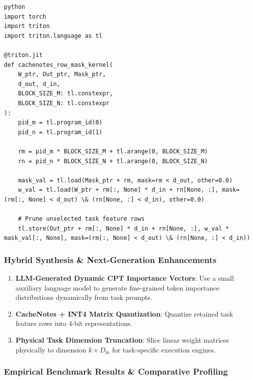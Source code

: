 \vspace{0.5em}
\begin{mdframed}[backgroundcolor=codebg, linecolor=codeframe, linewidth=1pt, roundcorner=4pt, innerleftmargin=2pt, innerrightmargin=5pt, innertopmargin=5pt, innerbottommargin=5pt]
\begin{lstlisting}
python
import torch
import triton
import triton.language as tl

@triton.jit
def cachenotes_row_mask_kernel(
    W_ptr, Out_ptr, Mask_ptr,
    d_out, d_in,
    BLOCK_SIZE_M: tl.constexpr,
    BLOCK_SIZE_N: tl.constexpr
):
    pid_m = tl.program_id(0)
    pid_n = tl.program_id(1)

    rm = pid_m * BLOCK_SIZE_M + tl.arange(0, BLOCK_SIZE_M)
    rn = pid_n * BLOCK_SIZE_N + tl.arange(0, BLOCK_SIZE_N)

    mask_val = tl.load(Mask_ptr + rm, mask=rm < d_out, other=0.0)
    w_val = tl.load(W_ptr + rm[:, None] * d_in + rn[None, :], mask=(rm[:, None] < d_out) \& (rn[None, :] < d_in), other=0.0)

    # Prune unselected task feature rows
    tl.store(Out_ptr + rm[:, None] * d_in + rn[None, :], w_val * mask_val[:, None], mask=(rm[:, None] < d_out) \& (rn[None, :] < d_in))
\end{lstlisting}
\end{mdframed}
\vspace{0.5em}


\subsubsection*{Hybrid Synthesis \& Next-Generation Enhancements}

\begin{enumerate}
\item \textbf{LLM-Generated Dynamic CPT Importance Vectors}: Use a small auxiliary language model to generate fine-grained token importance distributions dynamically from task prompts.
\item \textbf{CacheNotes + INT4 Matrix Quantization}: Quantize retained task feature rows into 4-bit representations.
\item \textbf{Physical Task Dimension Truncation}: Slice linear weight matrices physically to dimension $k \times D_{\text{in}}$ for task-specific execution engines.

\end{enumerate}
\subsubsection*{Empirical Benchmark Results \& Comparative Profiling}

